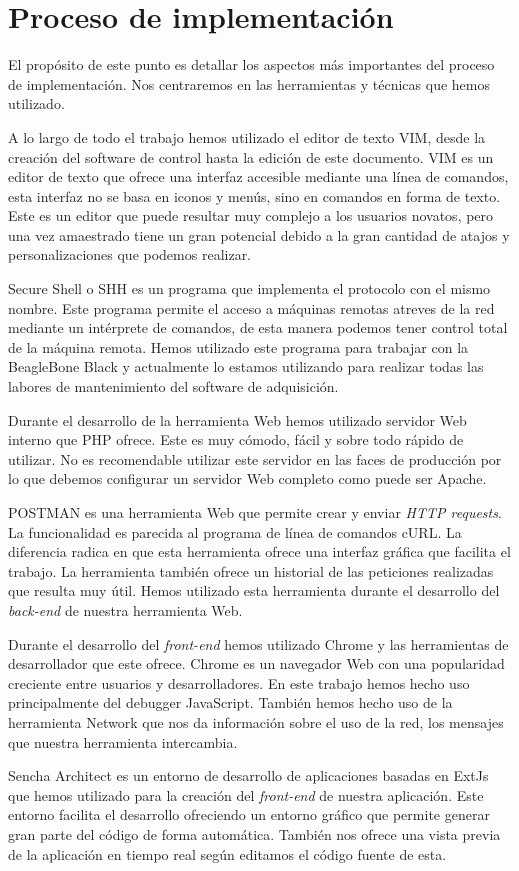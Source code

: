 \chapter{Proceso de implementación}
	El propósito de este punto es detallar los aspectos más importantes del proceso de implementación. Nos centraremos en las herramientas y
	técnicas que hemos utilizado.
	\par
	A lo largo de todo el trabajo hemos utilizado el editor de texto VIM\cite{vim}, desde la creación del software de control hasta la edición de
	este documento. VIM es un editor de texto que ofrece una interfaz accesible mediante una línea de comandos, esta interfaz no se basa en iconos
	y menús, sino en comandos en forma de texto. Este es un editor que puede resultar muy complejo a los usuarios novatos, pero una vez amaestrado
	tiene un gran potencial debido a la gran cantidad de atajos y personalizaciones que podemos realizar.
	\par
	Secure Shell o SHH\cite{ssh} es un programa que implementa el protocolo con el mismo nombre. Este programa permite el acceso a máquinas
	remotas atreves de  la red mediante un intérprete de comandos, de esta manera podemos tener control total de la máquina remota. Hemos
	utilizado este programa para trabajar con la BeagleBone Black y actualmente lo estamos utilizando para realizar todas  las labores de
	mantenimiento del software de adquisición.
	\par
	Durante el desarrollo de la herramienta Web hemos utilizado servidor Web interno que PHP ofrece. Este es muy cómodo, fácil y sobre todo rápido
	de utilizar. No es recomendable utilizar este servidor en las faces de producción por lo que debemos configurar un servidor Web completo como
	puede ser Apache\cite{Apache}.
	\par
	POSTMAN\cite{Postman} es una herramienta Web que permite crear y enviar \emph{HTTP requests}. La  funcionalidad es parecida al programa de
	línea de comandos cURL. La diferencia radica en que esta herramienta ofrece una interfaz gráfica que facilita el trabajo. La herramienta
	también ofrece un historial de las peticiones realizadas que resulta muy útil. Hemos utilizado esta herramienta durante el desarrollo del
	\emph{back-end} de nuestra herramienta Web.
	\par
	Durante el desarrollo del \emph{front-end} hemos utilizado Chrome y las herramientas de desarrollador que este ofrece\cite{ChromeDev}. Chrome
	es un navegador Web con una popularidad creciente entre usuarios y desarrolladores. En este trabajo hemos hecho uso principalmente del
	debugger JavaScript.  También hemos hecho uso de la herramienta Network que nos da información sobre el uso de la red, los mensajes que
	nuestra herramienta intercambia.
	\par
	Sencha Architect es un entorno de desarrollo de aplicaciones basadas en ExtJs que hemos utilizado para la creación del \emph{front-end} de
	nuestra aplicación. Este entorno facilita el desarrollo ofreciendo un entorno gráfico que permite generar gran parte del código de forma
	automática. También nos ofrece una vista previa de la aplicación en tiempo real según editamos el código fuente de esta. 

